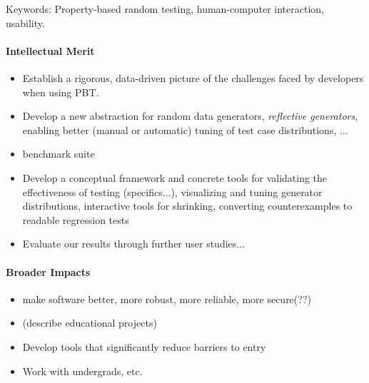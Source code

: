 Keywords: Property-based random testing, human-computer interaction,
usability.

\paragraph*{Intellectual Merit}
\begin{itemize}
\item Establish a rigorous, data-driven picture of the challenges
faced by developers when using PBT.
\item Develop a new abstraction for random data generators, {\em
  reflective generators}, enabling better (manual or automatic) tuning of test case
distributions, ...
\item benchmark suite
\item Develop a conceptual framework and concrete tools for validating
the effectiveness of testing (specifics...),
visualizing and tuning generator distributions,
interactive tools for shrinking,
converting counterexamples to readable regression tests
\item Evaluate our results through further user studies...
\end{itemize}

\paragraph*{Broader Impacts}
\begin{itemize}
\item make software better, more robust, more reliable, more secure(??)
\item (describe educational projects)
\item Develop tools that significantly reduce barriers to entry
\item Work with undergrads, etc.
\end{itemize}


